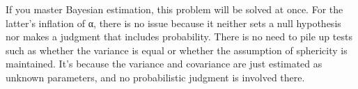 \documentclass{ltjbook}
\begin{document}
If you master Bayesian estimation, this problem will be solved at once. For the latter's inflation of α, there is no issue because it neither sets a null hypothesis nor makes a judgment that includes probability. There is no need to pile up tests such as whether the variance is equal or whether the assumption of sphericity is maintained. It's because the variance and covariance are just estimated as unknown parameters, and no probabilistic judgment is involved there.
\end{document}

